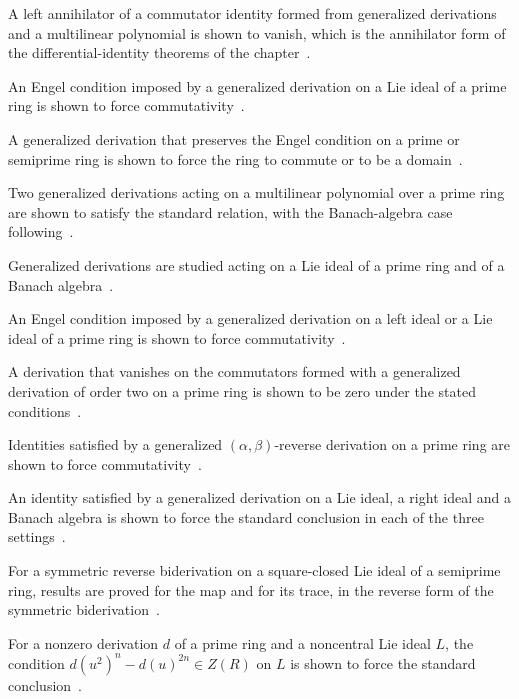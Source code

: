 A left annihilator of a commutator identity formed from generalized derivations and a multilinear polynomial is shown to vanish, which is the annihilator form of the differential-identity theorems of the chapter~\cite{WlLeftAnnihilatorOf2016}.

An Engel condition imposed by a generalized derivation on a Lie ideal of a prime ring is shown to force commutativity~\cite{WlGeneralizedDerivationsWithEnge2023}.

A generalized derivation that preserves the Engel condition on a prime or semiprime ring is shown to force the ring to commute or to be a domain~\cite{WlGeneralizedDerivationsPreservi2021}.

Two generalized derivations acting on a multilinear polynomial over a prime ring are shown to satisfy the standard relation, with the Banach-algebra case following~\cite{WlGeneralizedDerivationsActingOn2016}.

Generalized derivations are studied acting on a Lie ideal of a prime ring and of a Banach algebra~\cite{WlGeneralizedDerivationsActingOn2023}.

An Engel condition imposed by a generalized derivation on a left ideal or a Lie ideal of a prime ring is shown to force commutativity~\cite{WlEngelConditionsOfGeneralizedDe2020}.

A derivation that vanishes on the commutators formed with a generalized derivation of order two on a prime ring is shown to be zero under the stated conditions~\cite{WlDerivationsVanishingOnCommutat2017}.

Identities satisfied by a generalized $(\alpha,\beta)$-reverse derivation on a prime ring are shown to force commutativity~\cite{WlCommutativityOfPrimeRingsWithG2022}.

An identity satisfied by a generalized derivation on a Lie ideal, a right ideal and a Banach algebra is shown to force the standard conclusion in each of the three settings~\cite{WlAnIdentityWithGeneralizedDeriv2012}.

For a symmetric reverse biderivation on a square-closed Lie ideal of a semiprime ring, results are proved for the map and for its trace, in the reverse form of the symmetric biderivation~\cite{WlSomeResultsOnLieIdealsWithSymm2018}.

For a nonzero derivation $d$ of a prime ring and a noncentral Lie ideal $L$, the condition $d(u^2)^n-d(u)^{2n}\in Z(R)$ on $L$ is shown to force the standard conclusion~\cite{WlDerivationsAsAGeneralizationOf2019}.

